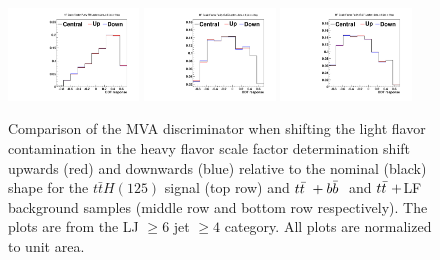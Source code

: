 \begin{description}
\begin{figure}[hbtp]
 \begin{center}
   \includegraphics[width=0.31\textwidth]{Figures/Analysis_2_Diagrams/SystPlot_CMS_ttH_CSVLF_ttH125_ljets_jge6_tge4}
   \includegraphics[width=0.31\textwidth]{Figures/Analysis_2_Diagrams/SystPlot_CMS_ttH_CSVLF_ttbarPlusBBbar_ljets_jge6_tge4}
   \includegraphics[width=0.31\textwidth]{Figures/Analysis_2_Diagrams/SystPlot_CMS_ttH_CSVLF_ttbar_ljets_jge6_tge4}
   \caption{ Comparison of the MVA discriminator when shifting the
     light flavor contamination in the heavy flavor scale factor
     determination shift upwards (red) and downwards (blue) relative
     to the nominal (black) shape for the $t\bar{t}H(125)$ signal (top
     row) and $t{\bar{t}}~+b{\bar{b}}~$ and $t{\bar{t}}~+$LF background samples
     (middle row and bottom row respectively).  The plots are from the
     LJ $\geq 6$ jet $\geq 4$ category.  All plots are normalized to unit area.}
   \label{fig:CSVLF}
 \end{center}
\end{figure}


\end{description}
